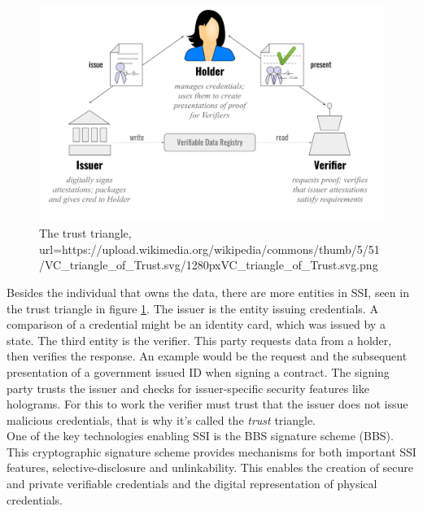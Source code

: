 \documentclass[
	a4paper               %
	,BCOR=0mm            %
	,bibliography=totoc   %
	,listof=totoc         %
	,monolingual
	,twoside=false
]{bfhthesis}              %
\begin{document}
\begin{figure}[h]
	\centering
	\includegraphics[width=12cm]{./img/trusttriangle.png}
	\caption{The trust triangle, url={https://upload.wikimedia.org/wikipedia/commons/thumb/5/51/VC\_triangle\_of\_Trust.svg/1280px\-VC\_triangle\_of\_Trust.svg.png}}
	\label{fig:trusttringle}
\end{figure}

Besides the individual that owns the data, there are more entities in SSI, seen in the trust triangle in figure \ref{fig:trusttringle}. The issuer is the entity issuing credentials. A comparison of a credential might be an identity card, which was issued by a state. The third entity is the verifier. This party requests data from a holder, then verifies the response. An example would be the request and the subsequent presentation of a government issued ID when signing a contract. The signing party trusts the issuer and checks for issuer-specific security features like holograms. For this to work the verifier must trust that the issuer does not issue malicious credentials, that is why it's called the \textit{trust} triangle. \\

One of the key technologies enabling SSI is the BBS signature scheme (BBS)\cite{bbs-signature-scheme}. This cryptographic signature scheme provides mechanisms for both important SSI features, selective-disclosure and unlinkability. This enables the creation of secure and private verifiable credentials and the digital representation of physical credentials. \\
\end{document}
